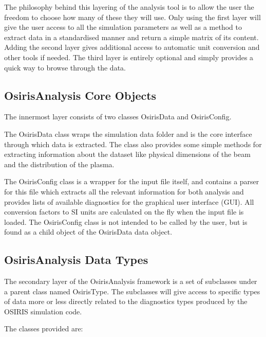 The philosophy behind this layering of the analysis tool is to allow the user the freedom to choose how many of these they will use. Only using the first layer will give the user access to all the simulation parameters as well as a method to extract data in a standardised manner and return a simple matrix of its content. Adding the second layer gives additional access to automatic unit conversion and other tools if needed. The third layer is entirely optional and simply provides a quick way to browse through the data.

\subsection{OsirisAnalysis Core Objects}
\label{Tools:OALay1}

The innermost layer consists of two classes OsirisData and OsirisConfig.

The OsirisData class wraps the simulation data folder and is the core interface through which data is extracted. The class also provides some simple methods for extracting information about the dataset like physical dimensions of the beam and the distribution of the plasma.

The OsirisConfig class is a wrapper for the input file itself, and contains a parser for this file which extracts all the relevant information for both analysis and provides lists of available diagnostics for the graphical user interface (GUI). All conversion factors to SI units are calculated on the fly when the input file is loaded. The OsirisConfig class is not intended to be called by the user, but is found as a child object of the OsirisData data object.

\subsection{OsirisAnalysis Data Types}
\label{Tools:OALay2}

The secondary layer of the OsirisAnalysis framework is a set of subclasses under a parent class named OsirisType. The subclasses will give access to specific types of data more or less directly related to the diagnostics types produced by the OSIRIS simulation code.

The classes provided are:

